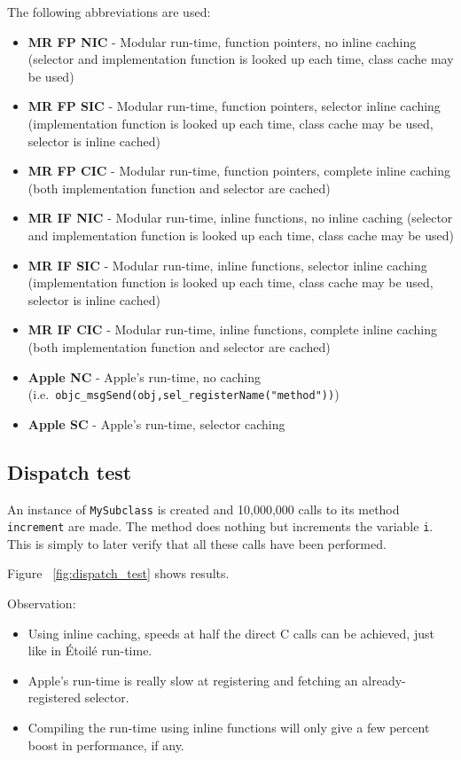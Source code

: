 The following abbreviations are used:
\begin{itemize}
  \item{\bf{MR FP NIC}} - Modular run-time, function pointers, no inline caching (selector and implementation function is looked up each time, class cache may be used)
  \item{\bf{MR FP SIC}} - Modular run-time, function pointers, selector inline caching (implementation function is looked up each time, class cache may be used, selector is inline cached)
  \item{\bf{MR FP CIC}} - Modular run-time, function pointers, complete inline caching (both implementation function and selector are cached)
  \item{\bf{MR IF NIC}} - Modular run-time, inline functions, no inline caching (selector and implementation function is looked up each time, class cache may be used)
  \item{\bf{MR IF SIC}} - Modular run-time, inline functions, selector inline caching (implementation function is looked up each time, class cache may be used, selector is inline cached)
  \item{\bf{MR IF CIC}} - Modular run-time, inline functions, complete inline caching (both implementation function and selector are cached)
  \item{\bf{Apple NC}} - Apple's run-time, no caching (i.e.\ \verb=objc_msgSend(obj,=\newline{}\verb=sel_registerName("method"))=)
  \item{\bf{Apple SC}} - Apple's run-time, selector caching 
\end{itemize}

\subsection{Dispatch test}

An instance of \verb=MySubclass= is created and 10,000,000 calls to its method \verb=increment= are made. The method does nothing but increments the variable \verb=i=. This is simply to later verify that all these calls have been performed.

Figure ~\ref{fig:dispatch_test} shows results.

Observation:

\begin{itemize}
  \item Using inline caching, speeds at half the direct C calls can be achieved, just like in \'Etoil\'e run-time.
  \item Apple's run-time is really slow at registering and fetching an already-registered selector.
  \item Compiling the run-time using inline functions will only give a few percent boost in performance, if any.
\end{itemize}

